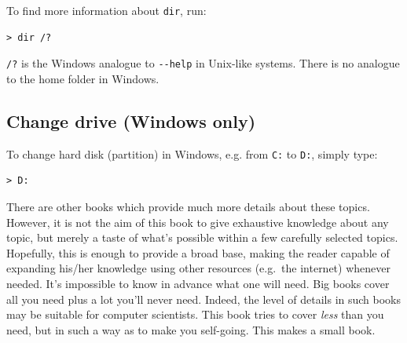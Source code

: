 To find more information about \verb|dir|, run:

\begin{verbatim}
> dir /?
\end{verbatim}
\verb|/?| is the Windows analogue to \verb|--help| in Unix-like systems. There is no analogue to the home folder in Windows.

\subsection{Change drive (Windows only)}
To change hard disk (partition) in Windows, e.g. from \verb|C:| to \verb|D:|, simply type:

\begin{verbatim}
> D:
\end{verbatim}

There are other books which provide much more details about these topics. However, it is not the aim of this book to give exhaustive knowledge about any topic, but merely a taste of what's possible within a few carefully selected topics. Hopefully, this is enough to provide a broad base, making the reader capable of expanding his/her knowledge using other resources (e.g.\ the internet) whenever needed. It's impossible to know in advance what one will need. Big books cover all you need plus a lot you'll never need. Indeed, the level of details in such books may be suitable for computer scientists. This book tries to cover \emph{less} than you need, but in such a way as to make you self-going. This makes a small book.